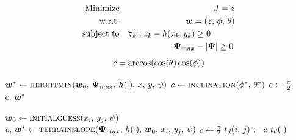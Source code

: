 \raisebox{2ex}
{
	\begin{minipage}[c]{0.35\linewidth}
    \centering
    \begin{eqnarray}
  		{\rm Minimize}   && J = \z \nonumber \\
  		{\rm w.r.t.}     && \boldsymbol{w} = \left( {\z},\, {\roll},\, {\pitch} \right) \nonumber \\
  		{\rm subject~to} && \forall_k: \z_k - \FunctionElevation(\x_k, \y_k) \geq 0 \hspace{10mm} \label{eq:minHeight} \\
                   	 	 && \boldsymbol{\Orientation}_{max} - \left| \boldsymbol{\Orientation} \right| \geq 0 \, \nonumber
	\end{eqnarray}
	\begin{equation}
		c = \arccos( \cos(\theta) \cos(\phi) )
		\label{eq:inclination}
	\end{equation}
  	\end{minipage}
}
\hfill
\raisebox{2ex}
{
	\begin{minipage}[c]{0.50\linewidth}
    \begin{algorithm}[H]
	\caption{\footnotesize \textsc{CELLSLOPEFIXYAW}}\label{alg:slopeMinHeight}
	\centering
	\footnotesize
	\begin{algorithmic}[1]
	\State $\boldsymbol{w}^* \gets \textsc{heightmin}(\boldsymbol{w}_0, \, \boldsymbol{\Psi}_{max},\, h(\cdot), \,x, \,y, \, \psi)$ \Comment{\eqref{eq:minHeight}}
	\State $c \gets \textsc{inclination}(\phi^*,\, \theta^*)$ \Comment{\eqref{eq:inclination}}
	\Else
	\State $c \gets \frac{\pi}{2}$
	\EndIf
	\State \Return $c, \, \boldsymbol{w}^*$
	\EndFunction
	\end{algorithmic}
	\end{algorithm}
	\end{minipage}
}

\begin{algorithm}[H]
	\caption{\footnotesize \textsc{MAPSLOPEFIXYAW}}\label{alg:slopeMinHeightMap}
	\centering
	\footnotesize
	\begin{algorithmic}[1]
	\State $\boldsymbol{w}_0 \gets \textsc{initialguess}(x_i,\, y_j, \, \psi)$ 
	\State $c,\,\boldsymbol{w}^* \gets \textsc{terrainslope}(\boldsymbol{\Psi}_{max},\, h(\cdot), \, \boldsymbol{w}_0, \, x_i, \, y_j, \, \psi)$ 
	\Else
	\State $c \gets \frac{\pi}{2}$
	\EndIf
	\State $t_d(i,\, j) \gets c$
	\EndFor
	\State \Return $t_d(\cdot)$ 
	\EndFunction
	\end{algorithmic}
\end{algorithm}

